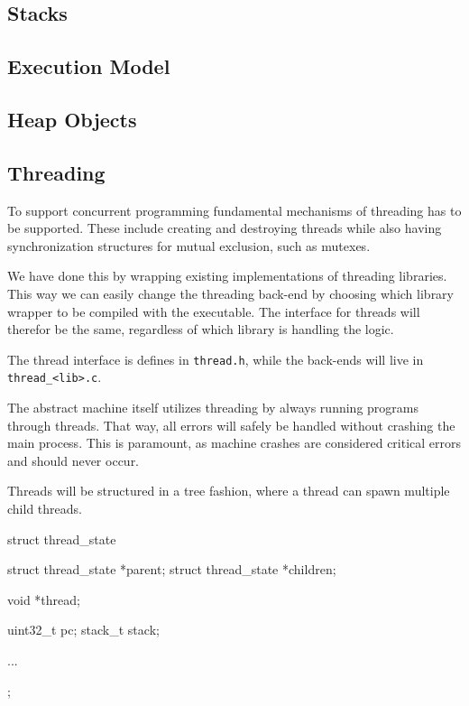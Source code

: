 \subsection{Stacks}
\label{sec:implementation:stacks}



\subsection{Execution Model}
% 


\subsection{Heap Objects}


\subsection{Threading}

To support concurrent programming fundamental mechanisms of threading has to be
supported. These include creating and destroying threads while also having
synchronization structures for mutual exclusion, such as mutexes.

We have done this by wrapping existing implementations of threading libraries.
This way we can easily change the threading back-end by choosing which library
wrapper to be compiled with the executable. The interface for threads will
therefor be the same, regardless of which library is handling the logic.

The thread interface is defines in {\tt thread.h}, while the back-ends will live
in {\tt thread\_<lib>.c}.

The abstract machine itself utilizes threading by always running programs
through threads. That way, all errors will safely be handled without crashing
the main process. This is paramount, as machine crashes are considered critical
errors and should never occur.

Threads will be structured in a tree fashion, where a thread can spawn multiple
child threads.
\begin{ccode}
struct thread_state {
    struct thread_state *parent;
    struct thread_state *children;

    void *thread;

    uint32_t pc;
    stack_t stack;

    ...
};
\end{ccode}

